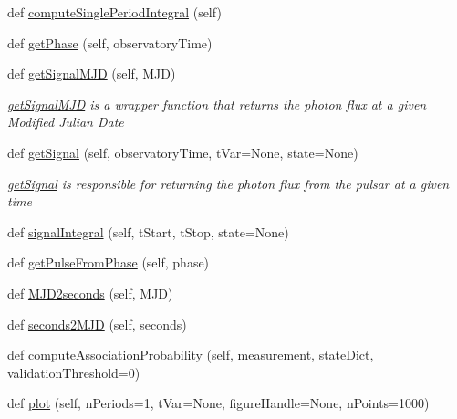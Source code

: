 \begin{DoxyCompactItemize}
def \hyperlink{classmodest_1_1signals_1_1xraysource_1_1PeriodicXRaySource_a20315b15ec1f6141e35a029b5cabf717}{compute\+Single\+Period\+Integral} (self)
\item 
def \hyperlink{classmodest_1_1signals_1_1xraysource_1_1PeriodicXRaySource_a3ea2f37c1387cc682819e667a8ce7f1e}{get\+Phase} (self, observatory\+Time)
\item 
def \hyperlink{classmodest_1_1signals_1_1xraysource_1_1PeriodicXRaySource_a9949b9a2d7a2ed0e4bb731e3e4fb7d2f}{get\+Signal\+M\+JD} (self, M\+JD)
\begin{DoxyCompactList}\small\item\em \hyperlink{classmodest_1_1signals_1_1xraysource_1_1PeriodicXRaySource_a9949b9a2d7a2ed0e4bb731e3e4fb7d2f}{get\+Signal\+M\+JD} is a wrapper function that returns the photon flux at a given Modified Julian Date \end{DoxyCompactList}\item 
def \hyperlink{classmodest_1_1signals_1_1xraysource_1_1PeriodicXRaySource_ac446c2e2083dbd59865c96c34dd6623f}{get\+Signal} (self, observatory\+Time, t\+Var=None, state=None)
\begin{DoxyCompactList}\small\item\em \hyperlink{classmodest_1_1signals_1_1xraysource_1_1PeriodicXRaySource_ac446c2e2083dbd59865c96c34dd6623f}{get\+Signal} is responsible for returning the photon flux from the pulsar at a given time \end{DoxyCompactList}\item 
def \hyperlink{classmodest_1_1signals_1_1xraysource_1_1PeriodicXRaySource_a6831477329995d78ffd9a6f32e276f48}{signal\+Integral} (self, t\+Start, t\+Stop, state=None)
\item 
def \hyperlink{classmodest_1_1signals_1_1xraysource_1_1PeriodicXRaySource_a252850e9966b3281a193c834cb687646}{get\+Pulse\+From\+Phase} (self, phase)
\item 
def \hyperlink{classmodest_1_1signals_1_1xraysource_1_1PeriodicXRaySource_abdd0337b42d16288c8ad3dede15a99f2}{M\+J\+D2seconds} (self, M\+JD)
\item 
def \hyperlink{classmodest_1_1signals_1_1xraysource_1_1PeriodicXRaySource_a023967f167c21ca3a6020eb36dd7a7d7}{seconds2\+M\+JD} (self, seconds)
\item 
def \hyperlink{classmodest_1_1signals_1_1xraysource_1_1PeriodicXRaySource_ae9e8cdc926982f0cfbf038b6857a5c83}{compute\+Association\+Probability} (self, measurement, state\+Dict, validation\+Threshold=0)
\item 
def \hyperlink{classmodest_1_1signals_1_1xraysource_1_1PeriodicXRaySource_a4f3c90e7e0acac8d077a53cabdb6437e}{plot} (self, n\+Periods=1, t\+Var=None, figure\+Handle=None, n\+Points=1000)

\end{DoxyCompactItemize}
